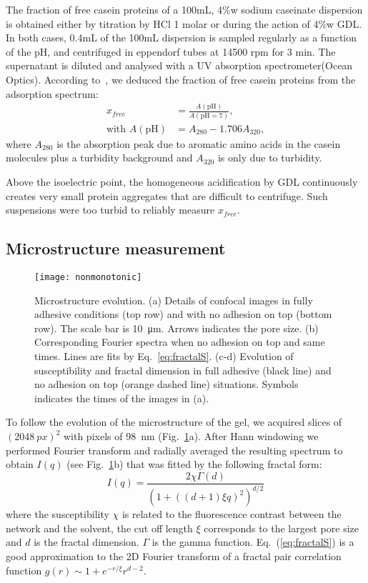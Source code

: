 \documentclass[twocolumn,superscriptaddress,showpacs,preprintnumbers,
amsmath,amssymb,prl]{revtex4-1}
\begin{document}
The fraction of free casein proteins of a 100mL, 4\%w sodium caseinate dispersion is obtained either by titration by HCl 1 molar or during the action of 4\%w GDL. In both cases, 0.4mL of the 100mL dispersion is sampled regularly as a function of the pH, and centrifuged in eppendorf tubes at 14500 rpm for 3 min. The supernatant is diluted and analysed with a UV absorption spectrometer(Ocean Optics). According to~\cite{Roefs1986}, we deduced the fraction of free casein proteins from the adsorption spectrum:
%
\begin{align}
x_{free} &= \frac{A(\text{pH})}{A(\text{pH}=7)},\\
\text{with }A(\text{pH}) &= A_{280}-1.706 A_{320},
\end{align}
%
where $A_{280}$ is the absorption peak due to aromatic amino acids in the casein molecules plus a turbidity background and $A_{320}$ is only due to turbidity. 

Above the isoelectric point, the homogeneous acidification by GDL continuously creates very small protein aggregates that are difficult to centrifuge. Such suspensions were too turbid to reliably measure $x_{free}$.

\subsection*{Microstructure measurement}

\begin{figure}[b]
	\texttt{[image: nonmonotonic]}%
	\caption{Microstructure evolution. (a) Details of confocal images in fully adhesive conditions (top row) and with no adhesion on top (bottom row). The scale bar is \SI{10}{\micro\metre}. Arrows indicates the pore size. (b) Corresponding Fourier spectra when no adhesion on top and same times. Lines are fits by Eq.~\ref{eq:fractalS}. (c-d) Evolution of susceptibility and fractal dimension in full adhesive (black line) and no adhesion on top (orange dashed line) situations. Symbols indicates the times of the images in (a).}%
	\label{fig:nonmonotonic}%
\end{figure}

To follow the evolution of the microstructure of the gel, we acquired slices of $(\SI{2048}{px})^2$ with pixels of \SI{98}{\nano\metre} (Fig.~\ref{fig:nonmonotonic}a). After Hann windowing we performed Fourier transform and radially averaged the resulting spectrum to obtain $I(q)$ (see Fig.~\ref{fig:nonmonotonic}b) that was fitted by the following fractal form:
\begin{equation}
I(q) = \frac{2\chi\Gamma(d)}{\left(1+\left((d+1)\xi q\right)^2\right)^{d/2}}
\label{eq:fractalS}
\end{equation}
where the susceptibility $\chi$ is related to the fluorescence contrast between the network and the solvent, the cut off length $\xi$ corresponds to the largest pore size and $d$ is the fractal dimension. $\Gamma$ is the gamma function. Eq.~(\ref{eq:fractalS}) is a good approximation to the 2D Fourier transform of a fractal pair correlation function $g(r) \sim 1+ e^{-r/\xi} r^{d-2}$.
\end{document}
